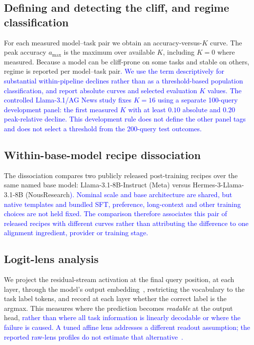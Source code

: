 \documentclass[pdflatex, sn-nature]{sn-jnl}%
\theoremstyle{thmstyleone}%
\theoremstyle{thmstyletwo}%
\theoremstyle{thmstylethree}%
\begin{document}
\subsection{Defining and detecting the cliff, and regime classification}
For each measured model--task pair we obtain an accuracy-versus-$K$ curve. The peak
accuracy $a_{\max}$ is the maximum over available $K$, including $K{=}0$ where measured.
Because a model can be cliff-prone on some tasks and stable on others, regime is reported
per model--task pair\textcolor{blue}{. We use the term descriptively for substantial within-pipeline declines rather than
as a threshold-based population classification, and report absolute curves and
selected evaluation $K$ values. The controlled Llama-3.1/AG News study fixes
$K{=}16$ using a separate 100-query development panel: the first measured $K$
with at least $0.10$ absolute and $0.20$ peak-relative decline. This development
rule does not define the other panel tags and does not select a
threshold from the 200-query test outcomes.}

\subsection{Within-base-model recipe dissociation}
The dissociation compares two publicly released post-training recipes over the same
named base model: Llama-3.1-8B-Instruct (Meta) versus
Hermes-3-Llama-3.1-8B (NousResearch\textcolor{blue}{). Nominal scale and base architecture are shared,
but native templates and bundled SFT, preference, long-context and other training
choices are not held fixed. The comparison therefore associates this pair of released
recipes with different curves rather than attributing the difference to one alignment
ingredient, provider or training stage.}

\subsection{Logit-lens analysis}
We project the residual-stream activation at the final query position, at each layer,
through the model's output embedding~\cite{nostalgebraist2020logit}, restricting the
vocabulary to the task label tokens, and record at each layer whether the correct label
is the argmax. This measures where the prediction becomes \emph{readable} at the
output head, \textcolor{blue}{rather than where all task information is linearly decodable or where the
failure is caused. A tuned affine lens addresses a different readout assumption; the reported
raw-lens profiles do not estimate that alternative}~\textcolor{blue}{\cite{belrose2023tunedlens}}\textcolor{blue}{.}
\end{document}
